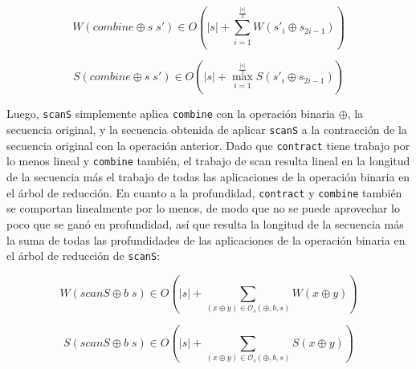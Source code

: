 \documentclass[a4paper,10pt]{article}
\begin{document}
\begin{equation*}
    W \left( combine \oplus s \; s' \right) \in
    O \left( \vert s \vert + \sum_{i=1}^{\frac{\vert s \vert}{2}} W \left( s'_{i} \oplus s_{2i - 1} \right) \right)
\end{equation*}

\begin{equation*}
    S \left( combine \oplus s \; s' \right) \in
    O \left( \vert s \vert + \max_{i=1}^{\frac{\vert s \vert}{2}} S \left( s'_{i} \oplus s_{2i - 1} \right) \right)
\end{equation*}

Luego, \texttt{scanS} simplemente aplica \texttt{combine} con la operación binaria
$\oplus$, la secuencia original, y la secuencia obtenida de aplicar \texttt{scanS}
a la contracción de la secuencia original con la operación anterior. Dado que
\texttt{contract} tiene trabajo por lo menos lineal y \texttt{combine} también,
el trabajo de scan resulta lineal en la longitud de la secuencia más el trabajo
de todas las aplicaciones de la operación binaria en el árbol de reducción. En
cuanto a la profundidad, \texttt{contract} y \texttt{combine} también se comportan
linealmente por lo menos, de modo que no se puede aprovechar lo poco que se ganó
en profundidad, así que resulta la longitud de la secuencia más la suma de todas
las profundidades de las aplicaciones de la operación binaria en el árbol de
reducción de \texttt{scanS}:

\begin{equation*}
    W \left( scanS \oplus b \; s \right) \in
    O \left( \vert s \vert + \sum_{(x \oplus y) \in \mathcal{O}_s(\oplus,b,s)} W \left( x \oplus y \right) \right)
\end{equation*}

\begin{equation*}
    S \left( scanS \oplus b \; s \right) \in
    O \left( \vert s \vert + \sum_{(x \oplus y) \in \mathcal{O}_s(\oplus,b,s)} S \left( x \oplus y \right) \right)
\end{equation*}

\newpage{}
\end{document}
